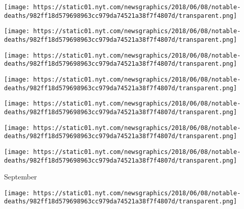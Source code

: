 \href{https://www.nytimes.com/2018/10/04/obituaries/rosa-bouglione-dead.html}{}

\texttt{[image: https://static01.nyt.com/newsgraphics/2018/06/08/notable-deaths/982ff18d579698963cc979da74521a38f7f4807d/transparent.png]}

\href{https://www.nytimes.com/2018/10/04/obituaries/dave-anderson-award-winning-times-sportswriter-dies-at-89.html}{}

\texttt{[image: https://static01.nyt.com/newsgraphics/2018/06/08/notable-deaths/982ff18d579698963cc979da74521a38f7f4807d/transparent.png]}

\href{https://www.nytimes.com/2018/10/03/science/leon-lederman-died-particle-accelerators.html}{}

\texttt{[image: https://static01.nyt.com/newsgraphics/2018/06/08/notable-deaths/982ff18d579698963cc979da74521a38f7f4807d/transparent.png]}

\href{https://www.nytimes.com/2018/10/02/obituaries/jane-fortune-dead.html}{}

\texttt{[image: https://static01.nyt.com/newsgraphics/2018/06/08/notable-deaths/982ff18d579698963cc979da74521a38f7f4807d/transparent.png]}

\href{https://www.nytimes.com/2018/10/02/obituaries/do-muoi-vietnams-leader-in-economic-transition-dies-at-101.html}{}

\texttt{[image: https://static01.nyt.com/newsgraphics/2018/06/08/notable-deaths/982ff18d579698963cc979da74521a38f7f4807d/transparent.png]}

\href{https://www.nytimes.com/2018/10/01/obituaries/jerry-gonzalez-innovator-of-latin-jazz-is-dead-at-69.html}{}

\texttt{[image: https://static01.nyt.com/newsgraphics/2018/06/08/notable-deaths/982ff18d579698963cc979da74521a38f7f4807d/transparent.png]}

\href{https://www.nytimes.com/2018/10/01/obituaries/charles-aznavour-dead.html}{}

\texttt{[image: https://static01.nyt.com/newsgraphics/2018/06/08/notable-deaths/982ff18d579698963cc979da74521a38f7f4807d/transparent.png]}

September

\href{https://www.nytimes.com/2018/09/29/arts/music/otis-rush-dead-chicago-blues-singer-guitarist.html}{}

\texttt{[image: https://static01.nyt.com/newsgraphics/2018/06/08/notable-deaths/982ff18d579698963cc979da74521a38f7f4807d/transparent.png]}

